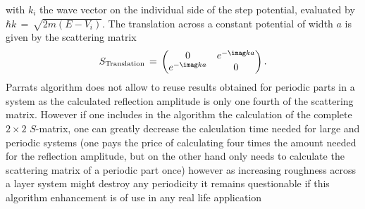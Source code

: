 \documentclass[\main/dresen_thesis.tex]{subfiles}
\begin{document}
with $k_i$ the wave vector on the individual side of the step potential, evaluated by $\hbar k\,=\,\sqrt{2m(E-V_i)}$.
The translation across a constant potential of width $a$ is given by the scattering matrix 
\begin{equation}
S_\mathrm{Translation} \, = \, \begin{pmatrix}
0 & e^{-\imag k a}\\
e^{-\imag k a} & 0
\end{pmatrix}.
\end{equation}
Parrats algorithm does not allow to reuse results obtained for periodic parts in a system as the calculated reflection amplitude is only one fourth of the scattering matrix. However if one includes in the algorithm the calculation of the complete $2\times2$ $S$-matrix, one can greatly decrease the calculation time needed for large and periodic systems (one pays the price of calculating four times the amount needed for the reflection amplitude, but on the other hand only needs to calculate the scattering matrix of a periodic part once)
however as increasing roughness across a layer system might destroy any periodicity it remains questionable if this algorithm enhancement is of use in any real life application
\end{document}
